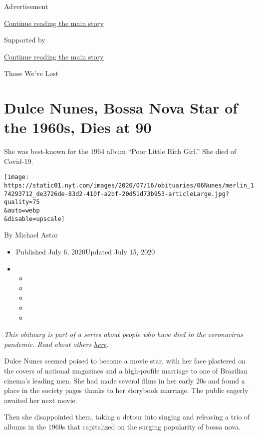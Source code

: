 Advertisement

\protect\hyperlink{after-top}{Continue reading the main story}

Supported by

\protect\hyperlink{after-sponsor}{Continue reading the main story}

Those We've Lost

\hypertarget{dulce-nunes-bossa-nova-star-of-the-1960s-dies-at-90}{%
\section{Dulce Nunes, Bossa Nova Star of the 1960s, Dies at
90}\label{dulce-nunes-bossa-nova-star-of-the-1960s-dies-at-90}}

She was best-known for the 1964 album ``Poor Little Rich Girl.'' She
died of Covid-19.

\texttt{[image: https://static01.nyt.com/images/2020/07/16/obituaries/06Nunes/merlin\_174293712\_de3726de-83d2-410f-a2bf-20d51d73b953-articleLarge.jpg?quality=75\\\&auto=webp\\\&disable=upscale]}

By Michael Astor

\begin{itemize}
\item
  Published July 6, 2020Updated July 15, 2020
\item
  \begin{itemize}
  \item
  \item
  \item
  \item
  \item
  \end{itemize}
\end{itemize}

\emph{This obituary is part of a series about people who have died in
the coronavirus pandemic. Read about others}
\href{https://www.nytimes.com/interactive/2020/obituaries/people-died-coronavirus-obituaries.html}{\emph{here}}\emph{.}

Dulce Nunes seemed poised to become a movie star, with her face
plastered on the covers of national magazines and a high-profile
marriage to one of Brazilian cinema's leading men. She had made several
films in her early 20s and found a place in the society pages thanks to
her storybook marriage. The public eagerly awaited her next movie.

Then she disappointed them, taking a detour into singing and releasing a
trio of albums in the 1960s that capitalized on the surging popularity
of bossa nova.

